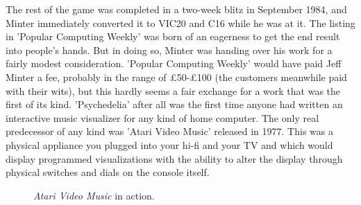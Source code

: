 The rest of the game was completed in a two-week blitz in September 1984, and Minter immediately converted it to VIC20 and C16 while he was at it.
The listing in 'Popular Computing Weekly' was born of an eagerness to get the end result into people's hands. But in doing so, Minter
was handing over his work for a fairly modest consideration. 'Popular Computing Weekly' would have paid Jeff Minter a fee, probably in the range of £50-£100 (the customers meanwhile paid with their wits), but this hardly seems a fair exchange for a work that was the first of its kind.
'Psychedelia' after all was the first time anyone had written an interactive music visualizer for any kind of home computer. The only 
real predecessor of any kind was 'Atari Video Music' released in 1977. This was a physical appliance you plugged into your hi-fi and
your TV and which would display programmed visualizations with the ability to alter the display through physical switches and dials on the 
console itself.
\begin{figure}[H]
    \centering
    \begin{adjustbox}{width=12cm,center}
      \hspace{0.5cm}
    \end{adjustbox}
  \caption{\textit{Atari Video Music} in action.}
\end{figure}

